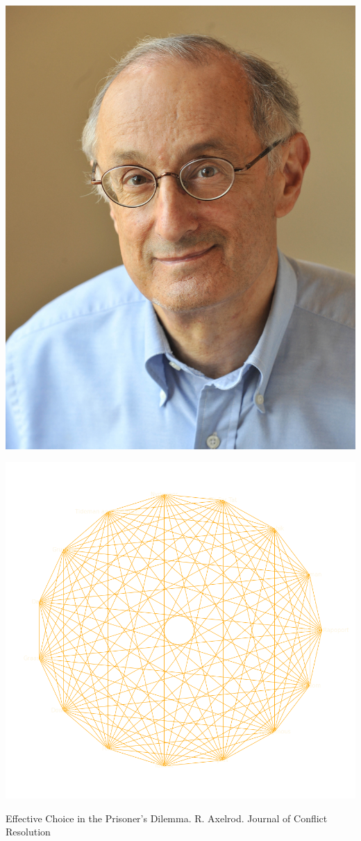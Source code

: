 \documentclass{beamer}
\begin{document}
\begin{frame}
    \begin{center}
    \includegraphics[width=.55\textwidth]{static/axelrod-robert.jpg}
    \end{center}
\end{frame}


\begin{frame}
    \begin{center}
    \includegraphics[width=.75\textwidth]{static/first_tournament}\\
    \vspace{1cm}

    \tiny{Effective Choice in the Prisoner's Dilemma. R. Axelrod. Journal of Conflict Resolution}
    \end{center}
\end{frame}
\end{document}

